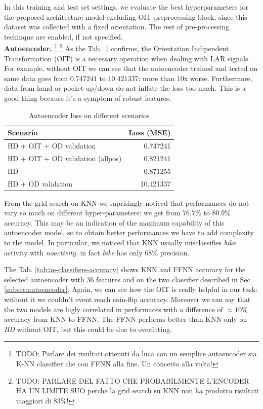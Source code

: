 In this training and test set settings, we evaluate the best hyperparameters for the proposed architecture model excluding OIT preprocessing block, since this dataset was collected with a fixed orientation. The rest of pre-processing techinque are enabled, if not specified.\\

\textbf{Autoencoder.}
 \footnote{TODO: Parlare dei risultati ottenuti da luca con un semplice
autoencoder sia K-NN classifier che con FFNN alla fine. Un concetto
alla volta!}
 \footnote{TODO: PARLARE DEL FATTO CHE PROBABILMENTE L'ENCODER HA UN LIMITE SUO perche la grid search su KNN non ha prodotto risultati maggiori di 83\%!}
As the Tab.~\ref{tab:ae-loss} confirms, the Orientation Indipendent
Transformation (OIT) is a necessary operation when dealing with
LAR signals. For example, without OIT we can see that the autoencoder
trained and tested on same data goes from $0.747241$ to $10.421337$:
more than $10$x worse. Furthermore, data from hand or pocket-up/down
do not inflate the loss too much. This is a good thing because it's a
symptom of robust features.  
\begin{table}[H]
  \centering
  \begin{tabular}{lr}
    \hline
    Scenario & Loss (MSE) \\
    \hline
    HD + OIT + OD validation & 0.747241 \\
    HD + OIT + OD validation (allpos) & 0.821241 \\
    HD & 0.871255 \\
    HD + OD validation & 10.421337 \\
    \hline
  \end{tabular}
  \caption{Autoencoder loss on different scenarios}
  \label{tab:ae-loss}
\end{table}

From the grid-search on KNN we suprisingly noticed that performances
do not vary so much on different hyper-parameters: we get from
$76.7$\% to $80.9$\% accuracy. This may be an indication of the
maximum capability of this autoencoder model, so to obtain better
performances we have to add complexity to the model. In particular, we
noticed that KNN usually misclassifies \textit{bike} activity with
\textit{no\textunderscore activity}, in fact \textit{bike} has only
$68$\% precision.

The Tab. \ref{tab:ae-classifiers-accuracy} shows KNN and FFNN accuracy
for the selected autoencoder with $36$ features and on the two
classifier described in Sec. \ref{subsec:autoencoder}. Again,
we can see how the OIT is really helpful in our task: without it we
couldn't event reach coin-flip accuracy. Moreover we can say that the
two models are higly correlated in performaces with a difference of
$\approx 10$\% accuracy from KNN to FFNN. The FFNN performs better
than KNN only on \textit{HD} without OIT, but this could be due to
overfitting. 

